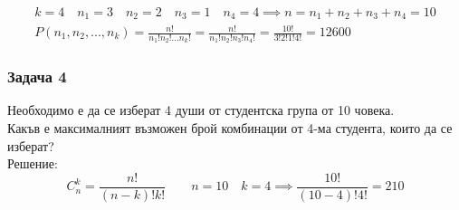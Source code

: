 \documentclass[fleqn, 12pt]{article}
\theoremstyle{definition}
\begin{document}
\begin{gather*}
k =4 \quad n_1 = 3 \quad n_2 = 2 \quad n_3 = 1 \quad n_4 = 4 \implies n = n_1 + n_2 + n_3 + n_4 = 10 \\
P(n_1, n_2,..., n_k) = \frac{n!}{n_1! n_2! ... n_k!}  = \frac{n!}{n_1! n_2! n_3! n_4!} = \frac{10!}{3! 2! 1! 4!} = 12600 
\end{gather*}

\subsubsection*{Задача 4}
Необходимо е да се изберат 4 души от студентска група от 10 човека. \\
Какъв е максималният възможен брой комбинации от 4-ма студента, които да се изберат? \\
Решение: \\
$$C_n ^k = \frac{n!}{(n-k)! k!} \qquad n = 10 \quad k = 4 \implies \frac{10!}{(10-4)! 4!} = 210$$
\end{document}
